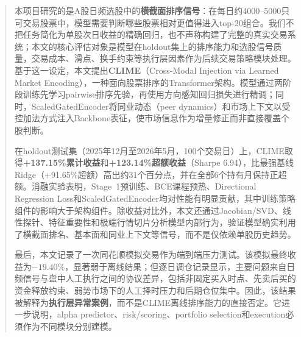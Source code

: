 \begin{abstract}
\noindent
本项目研究的是A股日频选股中的\textbf{横截面排序信号}：在每日约4000--5000只可交易股票中，模型需要判断哪些股票相对更值得进入top-20组合。我们不把任务简化为单股次日收益的精确回归，也不声称构建了完整的真实交易系统；本文的核心评估对象是模型在holdout集上的排序能力和选股信号质量，交易成本、滑点、换手约束等执行层因素作为后续交易策略模块处理。基于这一设定，本文提出\textbf{CLIME}（Cross-Modal Injection via Learned Market Encoding），一种面向股票排序的Transformer架构。模型通过两阶段训练先学习pairwise排序先验，再使用方向感知回归损失进行精调；同时，ScaledGatedEncoder将同业动态（peer dynamics）和市场上下文以受控加法方式注入Backbone表征，使市场信息作为增量修正而非直接覆盖个股判断。

在holdout测试集（2025年12月至2026年5月，100个交易日）上，CLIME取得\textbf{+137.15\%累计收益}和\textbf{+123.14\%超额收益}（Sharpe 6.94），比最强基线Ridge（+91.65\%超额）高出约31个百分点，并在全部6个持有月保持正超额。消融实验表明，Stage~1预训练、BCE课程预热、Directional Regression Loss和ScaledGatedEncoder均对性能有明显贡献，其中训练策略组件的影响大于架构组件。除收益对比外，本文还通过Jacobian/SVD、线性探针、特征重要性和极端行情切片分析模型内部行为，验证模型确实利用了横截面排名、基本面和同业上下文等信号，而不是仅依赖单股历史趋势。

最后，本文记录了一次同花顺模拟交易作为端到端压力测试。该模拟最终收益为$-19.40\%$，显著弱于离线结果；但逐日调仓记录显示，主要问题来自日频信号与盘中人工执行之间的协议差异，包括非固定买入时点、先卖后买的资金释放约束、弱势市场下的人工择时压力和后期仓位集中。因此，该结果被解释为\textbf{执行层异常案例}，而不是CLIME离线排序能力的直接否定。它进一步说明，alpha predictor、risk/scoring、portfolio selection和execution必须作为不同模块分别建模。

\end{abstract}
